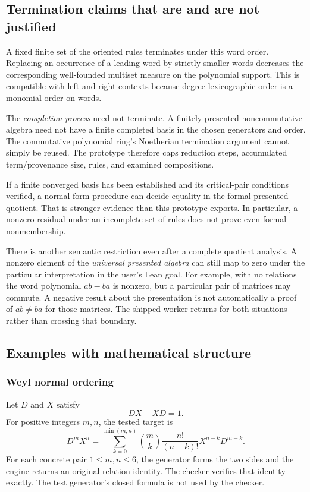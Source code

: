 \subsection{Termination claims that are and are not justified}
A fixed finite set of the oriented rules terminates under this word order. Replacing an occurrence of a leading word by strictly smaller words decreases the corresponding well-founded multiset measure on the polynomial support. This is compatible with left and right contexts because degree-lexicographic order is a monomial order on words.

The \emph{completion process} need not terminate. A finitely presented noncommutative algebra need not have a finite completed basis in the chosen generators and order. The commutative polynomial ring's Noetherian termination argument cannot simply be reused. The prototype therefore caps reduction steps, accumulated term/provenance size, rules, and examined compositions.

If a finite converged basis has been established and its critical-pair conditions verified, a normal-form procedure can decide equality in the formal presented quotient. That is stronger evidence than this prototype exports. In particular, a nonzero residual under an incomplete set of rules does not prove even formal nonmembership.

There is another semantic restriction even after a complete quotient analysis. A nonzero element of the \emph{universal presented algebra} can still map to zero under the particular interpretation in the user's Lean goal. For example, with no relations the word polynomial \(ab-ba\) is nonzero, but a particular pair of matrices may commute. A negative result about the presentation is not automatically a proof of \(ab\ne ba\) for those matrices. The shipped worker returns \unknown{} for both situations rather than crossing that boundary.

\subsection{Examples with mathematical structure}

\subsubsection{Weyl normal ordering}
Let \(D\) and \(X\) satisfy
\[
 DX-XD=1.
\]
For positive integers \(m,n\), the tested target is
\begin{equation}\label{eq:weyl}
 D^mX^n=\sum_{k=0}^{\min(m,n)}
 \binom{m}{k}\frac{n!}{(n-k)!}X^{n-k}D^{m-k}.
\end{equation}
For each concrete pair \(1\le m,n\le6\), the generator forms the two sides and the engine returns an original-relation identity. The checker verifies that identity exactly. The test generator's closed formula is not used by the checker.


